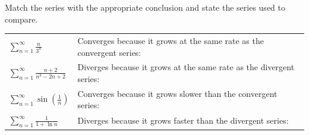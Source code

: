 \documentclass{discussion}
\begin{document}
\begin{question}
    Match the series with the appropriate conclusion and state the series used to compare.

    \begin{center}
        \setlength{\tabcolsep}{5em}
        \begin{tabularx}{\textwidth}{lX}
            \(\displaystyle \sum_{n=1}^\infty \frac{n}{3^n}\) & \linespread{1.4}\selectfont Converges because it grows at the same rate as the convergent series: \\
            \(\displaystyle \sum_{n=1}^\infty \frac{n + 2}{n^3 - 2n + 2}\) & \linespread{1.4}\selectfont Diverges because it grows at the same rate as the divergent series: \\
            \(\displaystyle \sum_{n=1}^\infty \sin \left( \frac{1}{n} \right)\) & \linespread{1.4}\selectfont Converges because it grows slower than the convergent series: \\
            \(\displaystyle \sum_{n=1}^\infty \frac{1}{1 + \ln n}\) & \linespread{1.4}\selectfont Diverges because it grows faster than the divergent series:
        \end{tabularx}
    \end{center}
\end{question}
\end{document}
